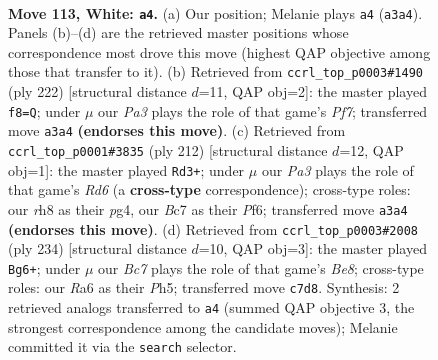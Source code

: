 \documentclass[11pt]{article}
\begin{document}
\clearpage

\begin{figure}[p]\centering
\begin{subfigure}{0.46\textwidth}\centering
\resizebox{\linewidth}{!}{%
\newchessgame
\chessboard[
  setfen={7r/2B4k/R7/8/7K/P7/8/8 w - - 18 113},
  showmover=false,
  pgfstyle=straightmove, color=movearrow, markmove={a3-a4}
]}
\caption{}
\end{subfigure}\hfill
\begin{subfigure}{0.46\textwidth}\centering
\resizebox{\linewidth}{!}{%
\newchessgame
\chessboard[
  setfen={8/4KP2/1rk5/8/8/8/8/8 w - - 2 112},
  showmover=false,
  pgfstyle=straightmove, color=movearrow, markmove={f7-f8}
]}
\caption{}
\end{subfigure}
\\[4pt]
\begin{subfigure}{0.46\textwidth}\centering
\resizebox{\linewidth}{!}{%
\newchessgame
\chessboard[
  setfen={8/8/3R1P2/8/6p1/5k2/r7/6K1 w - - 12 107},
  showmover=false,
  pgfstyle=straightmove, color=movearrow, markmove={d6-d3}
]}
\caption{}
\end{subfigure}\hfill
\begin{subfigure}{0.46\textwidth}\centering
\resizebox{\linewidth}{!}{%
\newchessgame
\chessboard[
  setfen={4B3/8/7p/5k1P/5r2/3K4/8/8 w - - 13 118},
  showmover=false,
  pgfstyle=straightmove, color=movearrow, markmove={e8-g6}
]}
\caption{}
\end{subfigure}
\caption{\textbf{Move 113, White: \texttt{a4}.} (a) Our position; Melanie plays \texttt{a4} (\texttt{a3a4}). Panels (b)--(d) are the retrieved master positions whose correspondence most drove this move (highest QAP objective among those that transfer to it). (b) Retrieved from \texttt{ccrl\_top\_p0003\#1490} (ply 222) [structural distance $d$=11, QAP obj=2]: the master played \texttt{f8=Q}; under $\mu$ our \emph{Pa3} plays the role of that game's \emph{Pf7}; transferred move \texttt{a3a4} \textbf{(endorses this move)}. (c) Retrieved from \texttt{ccrl\_top\_p0001\#3835} (ply 212) [structural distance $d$=12, QAP obj=1]: the master played \texttt{Rd3+}; under $\mu$ our \emph{Pa3} plays the role of that game's \emph{Rd6} (a \textbf{cross-type} correspondence); cross-type roles: our \emph{r}h8 as their \emph{p}g4, our \emph{B}c7 as their \emph{P}f6; transferred move \texttt{a3a4} \textbf{(endorses this move)}. (d) Retrieved from \texttt{ccrl\_top\_p0003\#2008} (ply 234) [structural distance $d$=10, QAP obj=3]: the master played \texttt{Bg6+}; under $\mu$ our \emph{Bc7} plays the role of that game's \emph{Be8}; cross-type roles: our \emph{R}a6 as their \emph{P}h5; transferred move \texttt{c7d8}. Synthesis: 2 retrieved analogs transferred to \texttt{a4} (summed QAP objective 3, the strongest correspondence among the candidate moves); Melanie committed it via the \texttt{search} selector.}
\label{fig:thought-m224}
\end{figure}
\end{document}
